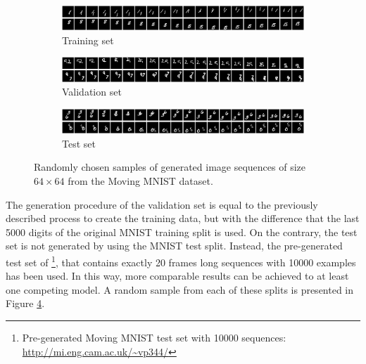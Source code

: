 \begin{figure}[htpb]
\centering
\begin{subfigure}{1.0\textwidth}
  \centering
  \includegraphics[width=1.0\linewidth]{figures/ds/mm_train.png}
  \caption{Training set}
  \label{fig:mm_train}
  \vspace{.1cm}
\end{subfigure}
\begin{subfigure}{1.0\textwidth}
  \centering
  \includegraphics[width=1.0\linewidth]{figures/ds/mm_valid.png}
  \caption{Validation set}
  \label{fig:mm_valid}
  \vspace{.1cm}
\end{subfigure}
\begin{subfigure}{1.0\textwidth}
  \centering
  \includegraphics[width=1.0\linewidth]{figures/ds/mm_test.png}
  \caption{Test set}
  \label{fig:mm_test}
\end{subfigure}
\caption[MovingMNIST Image Sequence Samples]{Randomly chosen samples of generated image sequences of size $64 \times 64$ from the Moving MNIST dataset.}
\label{fig:moving_mnist}
\end{figure}

The generation procedure of the validation set is equal to the previously described process to create the training data, but with the difference that the last \num{5000} digits of the original MNIST training split is used. On the contrary, the test set is not generated by using the MNIST test split. Instead, the pre-generated test set of \parencite{spat_temp_video_autoenc}\footnote{Pre-generated Moving MNIST test set with \num{10000} sequences: \url{http://mi.eng.cam.ac.uk/~vp344/}}, that contains exactly \num{20} frames long sequences with \num{10000} examples has been used. In this way, more comparable results can be achieved to at least one competing model. A random sample from each of these splits is presented in Figure \ref{fig:moving_mnist}.

